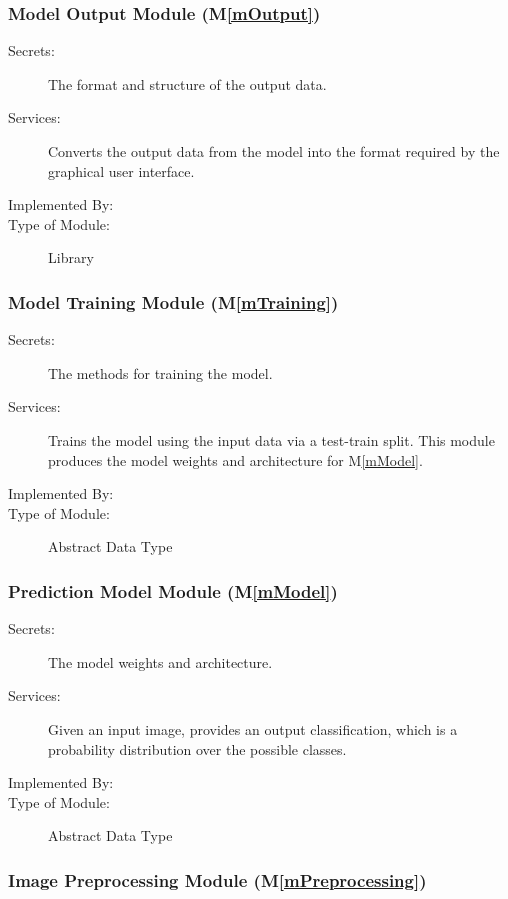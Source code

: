 \documentclass[12pt, titlepage]{article}
\newcommand{\mref}[1]{M\ref{#1}}
\begin{document}
\subsubsection{Model Output Module (\mref{mOutput})}

\begin{description}
\item[Secrets:] The format and structure of the output data.
\item[Services:] Converts the output data from the model into the format
required by the graphical user interface.
\item[Implemented By:] \progname{}
\item[Type of Module:] Library
\end{description}

\subsubsection{Model Training Module (\mref{mTraining})}

\begin{description}
\item[Secrets:] The methods for training the model.
\item[Services:] Trains the model using the input data via a test-train split.
This module produces the model weights and architecture for \mref{mModel}.
\item[Implemented By:] \progname{}
\item[Type of Module:] Abstract Data Type
\end{description}

\subsubsection{Prediction Model Module (\mref{mModel})}

\begin{description}
\item[Secrets:] The model weights and architecture.
\item[Services:] Given an input image, provides an output classification, which
is a probability distribution over the possible classes.
\item[Implemented By:] \progname{}
\item[Type of Module:] Abstract Data Type
\end{description}

\subsubsection{Image Preprocessing Module (\mref{mPreprocessing})}
\end{document}
